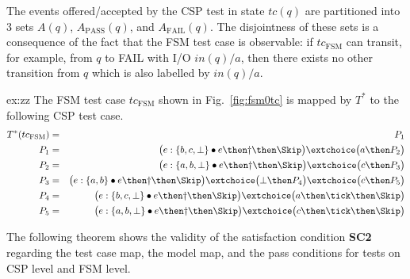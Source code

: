 The events offered/accepted by the CSP test in state $tc(q)$ are partitioned into
3 sets $A(q)$, $A_\text{PASS}(q)$, and $A_\text{FAIL}(q)$. The disjointness of these
sets is a consequence of the fact that the FSM test case is observable: if
$tc_\text{FSM}$ can transit, for example, from $q$ to FAIL with I/O $in(q)/a$,
then there exists no other transition from $q$ which is also
labelled by $in(q)/a$.



\begin{example}{ex:zz}
The FSM test case $tc_\text{FSM}$
shown in Fig.~\ref{fig:fsm0tc} is mapped by $T^*$ to the following
CSP test case.
\begin{eqnarray*}
T^*(tc_\text{FSM}) & = & P_1
\\
P_1 & = & \big(e:\{ b,c,\bot \} \bullet e \then \dag\then\Skip\big)
\extchoice
 \big( a \then P_2 \big)
\\
P_2 & = & \big( e : \{ a,b,\bot \}\bullet e\then \dag\then\Skip  \big)
\extchoice
\big( c\then P_3 \big)
\\
P_3 & = & \big( e : \{ a,b \}\bullet e\then \dag\then\Skip  \big)
\extchoice
\big( \bot \then P_4 \big)
\extchoice
\big( c\then P_5 \big)
\\
P_4 & = & \big( e : \{ b,c,\bot \}\bullet e\then \dag\then\Skip  \big)
\extchoice
\big( a\then\tick\then \Skip \big)
\\
P_5 & = & \big( e : \{ a,b,\bot \}\bullet e\then \dag\then\Skip  \big)
\extchoice
\big( c\then\tick\then \Skip \big)
\end{eqnarray*}
\end{example}

The following theorem shows the validity of the satisfaction condition {\bf SC2}
regarding the test case map, the model map, and the pass conditions for tests on CSP level and FSM level.

